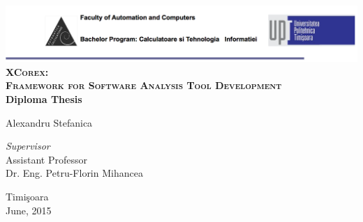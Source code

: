 \begin{titlepage}
	\begin{center}	
		\includegraphics[width=\textwidth]{../img/header.png}\\[4cm]
		
		{\huge \bfseries \textsc{XCorex:\vspace{\fill}\\ Framework for Software
Analysis Tool Development\vspace{\fill}}}
		\\[3cm]
		
		{\bfseries Diploma Thesis} \\[3cm]
						
				
		\begin{flushright}
				\large Alexandru Stefanica \\[1cm]
		\end{flushright}
		\begin{flushleft}
			 \large
				\emph{Supervisor} \\
				Assistant Professor \\
				Dr. Eng. Petru-Florin Mihancea \\[1cm]
		\end{flushleft}
		
		\vfill
		{\large {Timi\c{s}oara \\June, 2015}}
	\end{center}
\end{titlepage}
